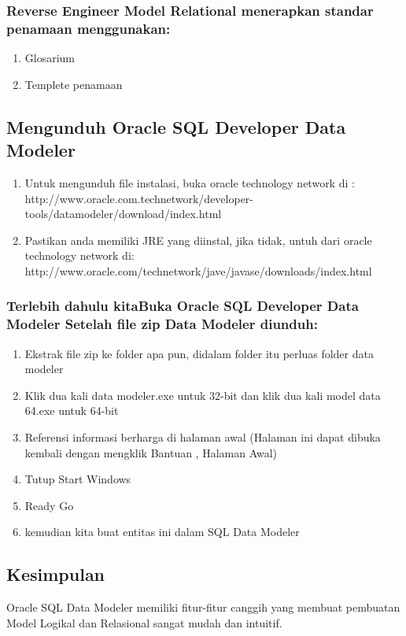 \documentclass{article}
\begin{document}
\begin{enumerate}
\subsubsection{Reverse Engineer Model Relational menerapkan standar penamaan menggunakan:}
\begin{enumerate}
    \item Glosarium
    \item Templete penamaan 
\end{enumerate}
\subsection{Mengunduh Oracle SQL Developer Data Modeler}
 \begin{enumerate}
       \item Untuk mengunduh file instalasi, buka oracle technology network di :
http://www.oracle.com.technetwork/developer-tools/datamodeler/download/index.html
        \item Pastikan anda memiliki JRE yang diinstal, jika tidak, untuh dari oracle technology network di:
http://www.oracle.com/technetwork/jave/javase/downloads/index.html
   \end{enumerate}
\subsubsection{Terlebih dahulu kitaBuka Oracle SQL Developer Data Modeler
Setelah file zip Data Modeler diunduh:}
\begin{enumerate}
    \item Ekstrak file zip ke folder apa pun, didalam folder itu perluas folder data modeler
    \item Klik dua kali data modeler.exe untuk 32-bit dan klik dua kali model data 64.exe untuk 64-bit
    \item Referensi informasi berharga di halaman awal (Halaman ini dapat dibuka kembali dengan mengklik Bantuan , Halaman Awal)
    \item Tutup Start Windows
    \item Ready Go
    \item kemudian kita buat entitas ini dalam SQL Data Modeler
\end{enumerate}
\subsection{Kesimpulan}
Oracle SQL Data Modeler memiliki fitur-fitur canggih yang membuat  pembuatan Model Logikal dan Relasional sangat mudah dan intuitif.


\end{enumerate}
\end{document}
